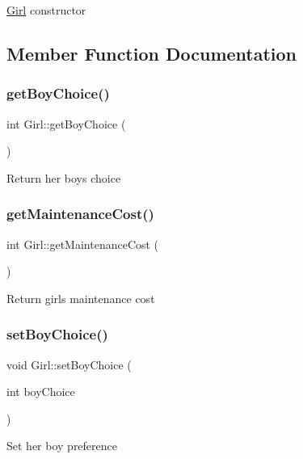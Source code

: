 \hyperlink{class_girl}{Girl} constructor 

\subsection{Member Function Documentation}
\mbox{\label{class_girl_a23ed372fae6fc44694d5ffa39fa455cb}} 
\subsubsection{\texorpdfstring{get\+Boy\+Choice()}{getBoyChoice()}}
{\footnotesize\ttfamily int Girl\+::get\+Boy\+Choice (\begin{DoxyParamCaption}{ }\end{DoxyParamCaption})}

Return her boy\textquotesingle{}s choice \mbox{\label{class_girl_a8fa9751cb04f9c510a635c9f19a1d4d9}} 
\subsubsection{\texorpdfstring{get\+Maintenance\+Cost()}{getMaintenanceCost()}}
{\footnotesize\ttfamily int Girl\+::get\+Maintenance\+Cost (\begin{DoxyParamCaption}{ }\end{DoxyParamCaption})}

Return girl\textquotesingle{}s maintenance cost \mbox{\label{class_girl_a48efb2fda11ce41c74511be3bfc2510c}} 
\subsubsection{\texorpdfstring{set\+Boy\+Choice()}{setBoyChoice()}}
{\footnotesize\ttfamily void Girl\+::set\+Boy\+Choice (\begin{DoxyParamCaption}\item[{int}]{boy\+Choice }\end{DoxyParamCaption})}

Set her boy preference


